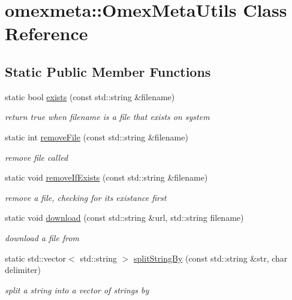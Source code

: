 \hypertarget{classomexmeta_1_1OmexMetaUtils}{}\section{omexmeta\+:\+:Omex\+Meta\+Utils Class Reference}
\label{classomexmeta_1_1OmexMetaUtils}
\subsection*{Static Public Member Functions}
\begin{DoxyCompactItemize}
\item 
static bool \hyperlink{classomexmeta_1_1OmexMetaUtils_ab72b362607e6bbdd0025eefa574cd073}{exists} (const std\+::string \&filename)
\begin{DoxyCompactList}\small\item\em return true when filename is a file that exists on system \end{DoxyCompactList}\item 
static int \hyperlink{classomexmeta_1_1OmexMetaUtils_a9c445a8e0cc6589b25d6fa630686c171}{remove\+File} (const std\+::string \&filename)
\begin{DoxyCompactList}\small\item\em remove file called \end{DoxyCompactList}\item 
static void \hyperlink{classomexmeta_1_1OmexMetaUtils_a8e629136cb2685ed839ea3a0e88094e6}{remove\+If\+Exists} (const std\+::string \&filename)
\begin{DoxyCompactList}\small\item\em remove a file, checking for its existance first \end{DoxyCompactList}\item 
static void \hyperlink{classomexmeta_1_1OmexMetaUtils_a046b603d6308242b70b55de6cb72325c}{download} (const std\+::string \&url, std\+::string filename)
\begin{DoxyCompactList}\small\item\em download a file from \end{DoxyCompactList}\item 
static std\+::vector$<$ std\+::string $>$ \hyperlink{classomexmeta_1_1OmexMetaUtils_aac769ce6e901f32820cd7dc3fef989fa}{split\+String\+By} (const std\+::string \&str, char delimiter)
\begin{DoxyCompactList}\small\item\em split a string into a vector of strings by \end{DoxyCompactList}\item 

\end{DoxyCompactItemize}
